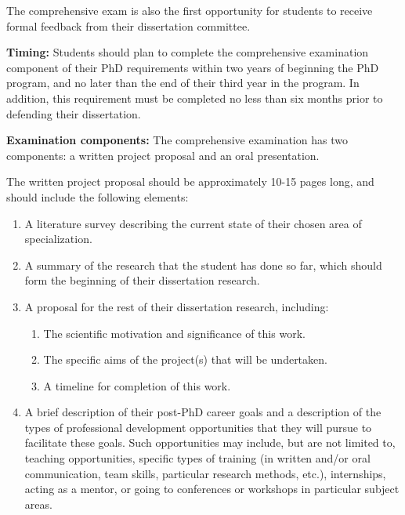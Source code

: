 The comprehensive exam is also the first opportunity for students to
receive formal feedback from their dissertation committee.

\vspace{2mm}
\noindent
\textbf{Timing:} Students should plan to complete the comprehensive
examination component of their PhD requirements within two years of
beginning the PhD program, and no later than the end of their third
year in the program.  In addition, this requirement must be completed
no less than six months prior to defending their dissertation. 


\vspace{2mm}
\noindent
\textbf{Examination components:} The comprehensive examination has two components: a written project proposal and an oral presentation.

The written project proposal should be approximately 10-15 pages long, and should include the following elements:

\begin{enumerate}
\item  A literature survey describing the current state of their chosen area of specialization.
\item  A summary of the research that the student has done so far, which should form the beginning of their dissertation research.
\item  A proposal for the rest of their dissertation research, including:

\begin{enumerate}
  \item  The scientific motivation and significance of this work.
  \item  The specific aims of the project(s) that will be undertaken.
  \item  A timeline for completion of this work.
\end{enumerate}

\item  A brief description of their post-PhD career goals and a
  description of the types of professional development opportunities
  that they will pursue to facilitate these goals.  Such opportunities
  may include, but are not limited to, teaching opportunities, specific types of training (in
  written and/or oral communication, team skills, particular research
  methods, etc.), internships, acting as a mentor, or going to
  conferences or workshops in particular subject areas.

\end{enumerate}

